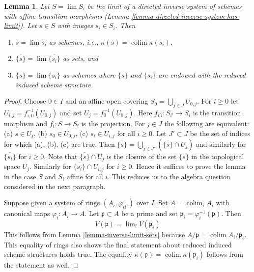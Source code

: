 \documentclass{stacks-project}
\theoremstyle{plain}
\newtheorem{lemma}[subsection]{Lemma}
\theoremstyle{definition}
\theoremstyle{remark}
\numberwithin{equation}{subsection}
\def\lim{\mathop{\mathrm{lim}}\nolimits}
\def\colim{\mathop{\mathrm{colim}}\nolimits}
\begin{document}
\begin{lemma}
\label{lemma-inverse-limit-irreducibles}
Let $S = \lim S_i$ be the limit of a directed inverse system
of schemes with affine transition morphisms
(Lemma \ref{lemma-directed-inverse-system-has-limit}).
Let $s \in S$ with images $s_i \in S_i$.
Then
\begin{enumerate}
\item $s = \lim s_i$ as schemes, i.e., $\kappa(s) = \colim \kappa(s_i)$,
\item $\overline{\{s\}} = \lim \overline{\{s_i\}}$ as sets, and
\item $\overline{\{s\}} = \lim \overline{\{s_i\}}$ as schemes
where $\overline{\{s\}}$ and $\overline{\{s_i\}}$ are
endowed with the reduced induced scheme structure.
\end{enumerate}
\end{lemma}

\begin{proof}
Choose $0 \in I$ and an affine open covering
$S_0 = \bigcup_{j \in J} U_{0, j}$.
For $i \geq 0$ let $U_{i, j} = f_{i, 0}^{-1}(U_{0, j})$
and set $U_j = f_0^{-1}(U_{0, j})$.
Here $f_{i'i} : S_{i'} \to S_i$ is the transition morphism
and $f_i : S \to S_i$ is the projection.
For $j \in J$ the following are equivalent:
(a) $s \in U_j$, (b) $s_0 \in U_{0, j}$,
(c) $s_i \in U_{i, j}$ for all $i \geq 0$.
Let $J' \subset J$ be the set of indices for which (a), (b), (c) are true.
Then $\overline{\{s\}} = \bigcup_{j \in J'} (\overline{\{s\}} \cap U_j)$
and similarly for $\overline{\{s_i\}}$ for $i \geq 0$.
Note that $\overline{\{s\}} \cap U_j$ is the closure of the
set $\{s\}$ in the topological space $U_j$. Similarly for
$\overline{\{s_i\}} \cap U_{i, j}$ for $i \geq 0$.
Hence it suffices to prove the lemma in the case
$S$ and $S_i$ affine for all $i$. This reduces us to the
algebra question considered in the next paragraph.

\medskip\noindent
Suppose given a system of rings $(A_i, \varphi_{ii'})$
over $I$. Set $A = \colim_i A_i$ with canonical maps
$\varphi_i : A_i \to A$. Let $\mathfrak p \subset A$ be a
prime and set $\mathfrak p_i = \varphi_i^{-1}(\mathfrak p)$.
Then
$$
V(\mathfrak p) = \lim_i V(\mathfrak p_i)
$$
This follows from Lemma \ref{lemma-inverse-limit-sets}
because $A/\mathfrak p = \colim A_i/\mathfrak p_i$.
This equality of rings also shows the final statement
about reduced induced scheme structures holds true.
The equality $\kappa(\mathfrak p) = \colim \kappa(\mathfrak p_i)$
follows from the statement as well.
\end{proof}
\end{document}

